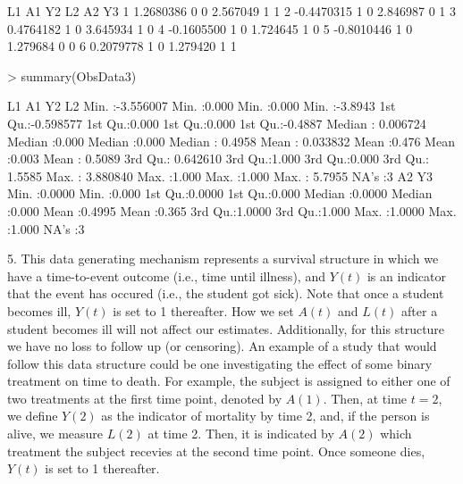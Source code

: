 \documentclass[answers]{exam}
\newenvironment{myfigure}{\captionsetup{type=mytype}}{}
\begin{document}
\begin{solution}
\begin{Schunk}
\begin{Soutput}
          L1 A1 Y2       L2 A2 Y3
1  1.2680386  0  0 2.567049  1  1
2 -0.4470315  1  0 2.846987  0  1
3  0.4764182  1  0 3.645934  1  0
4 -0.1605500  1  0 1.724645  1  0
5 -0.8010446  1  0 1.279684  0  0
6  0.2079778  1  0 1.279420  1  1
\end{Soutput}
\begin{Sinput}
> summary(ObsData3)
\end{Sinput}
\begin{Soutput}
       L1                  A1              Y2              L2         
 Min.   :-3.556007   Min.   :0.000   Min.   :0.000   Min.   :-3.8943  
 1st Qu.:-0.598577   1st Qu.:0.000   1st Qu.:0.000   1st Qu.:-0.4887  
 Median : 0.006724   Median :0.000   Median :0.000   Median : 0.4958  
 Mean   : 0.033832   Mean   :0.476   Mean   :0.003   Mean   : 0.5089  
 3rd Qu.: 0.642610   3rd Qu.:1.000   3rd Qu.:0.000   3rd Qu.: 1.5585  
 Max.   : 3.880840   Max.   :1.000   Max.   :1.000   Max.   : 5.7955  
                                                     NA's   :3        
       A2               Y3       
 Min.   :0.0000   Min.   :0.000  
 1st Qu.:0.0000   1st Qu.:0.000  
 Median :0.0000   Median :0.000  
 Mean   :0.4995   Mean   :0.365  
 3rd Qu.:1.0000   3rd Qu.:1.000  
 Max.   :1.0000   Max.   :1.000  
 NA's   :3                       
\end{Soutput}
\end{Schunk}
5. This data generating mechanism represents a survival structure in which we have a time-to-event outcome (i.e., time until illness), and $Y(t)$ is an indicator that the event has occured (i.e., the student got sick). Note that once a student becomes ill, $Y(t)$ is set to 1 thereafter. How we set $A(t)$ and $L(t)$ after a student becomes ill will not affect our estimates. Additionally, for this structure we have no loss to follow up (or censoring). An example of a study that would follow this data structure could be one investigating the effect of some binary treatment on time to death. For example, the subject is assigned to either one of two treatments at the first time point, denoted by $A(1)$. Then, at time $t = 2$, we define $Y(2)$ as the indicator of mortality by time 2, and, if the person is alive, we measure $L(2)$ at time 2. Then, it is indicated by $A(2)$ which treatment the subject recevies at the second time point. Once someone dies, $Y(t)$ is set to 1 thereafter. 


\end{solution}
\end{document}
